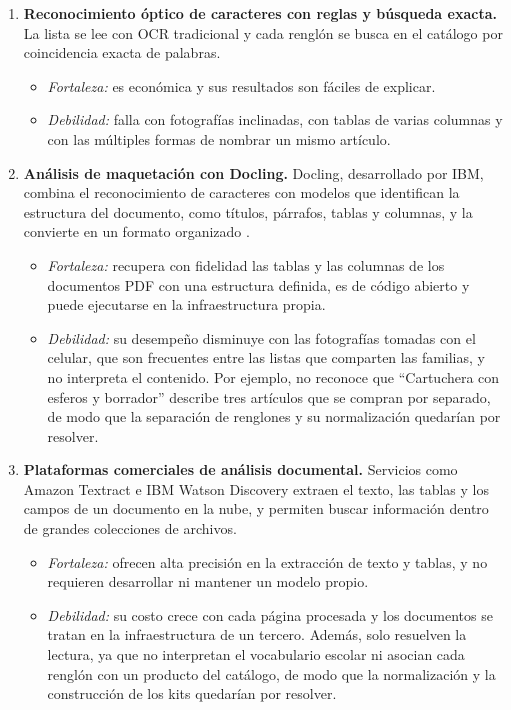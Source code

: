 \begin{enumerate}
  \item \textbf{Reconocimiento óptico de caracteres con reglas y búsqueda exacta.} La lista
        se lee con OCR tradicional \citep{smith_overview_2007} y cada renglón se busca en el
        catálogo por coincidencia exacta de palabras.
        \begin{itemize}
          \item \textit{Fortaleza:} es económica y sus resultados son fáciles de explicar.
          \item \textit{Debilidad:} falla con fotografías inclinadas, con tablas de varias
                columnas y con las múltiples formas de nombrar un mismo artículo.
        \end{itemize}

\item \textbf{Análisis de maquetación con Docling.} Docling, desarrollado por IBM,
      combina el reconocimiento de caracteres con modelos que identifican la estructura
      del documento, como títulos, párrafos, tablas y columnas, y la convierte en un
      formato organizado \citep{auer_docling_2024}.
      \begin{itemize}
        \item \textit{Fortaleza:} recupera con fidelidad las tablas y las columnas de los
              documentos PDF con una estructura definida, es de código abierto y puede
              ejecutarse en la infraestructura propia.
        \item \textit{Debilidad:} su desempeño disminuye con las fotografías tomadas con
              el celular, que son frecuentes entre las listas que comparten las familias,
              y no interpreta el contenido. Por ejemplo, no reconoce que ``Cartuchera con
              esferos y borrador'' describe tres artículos que se compran por separado, de
              modo que la separación de renglones y su normalización quedarían por
              resolver.
      \end{itemize}
        \item \textbf{Plataformas comerciales de análisis documental.} Servicios como Amazon
      Textract \citep{aws_textract_2026} e IBM Watson Discovery \citep{ibm_discovery_2026}
      extraen el texto, las tablas y los campos de un documento en la nube, y permiten
      buscar información dentro de grandes colecciones de archivos.
      \begin{itemize}
        \item \textit{Fortaleza:} ofrecen alta precisión en la extracción de texto y
              tablas, y no requieren desarrollar ni mantener un modelo propio.
        \item \textit{Debilidad:} su costo crece con cada página procesada y los documentos
              se tratan en la infraestructura de un tercero. Además, solo resuelven la
              lectura, ya que no interpretan el vocabulario escolar ni asocian cada
              renglón con un producto del catálogo, de modo que la normalización y la
              construcción de los kits quedarían por resolver.
      \end{itemize}
\end{enumerate}



